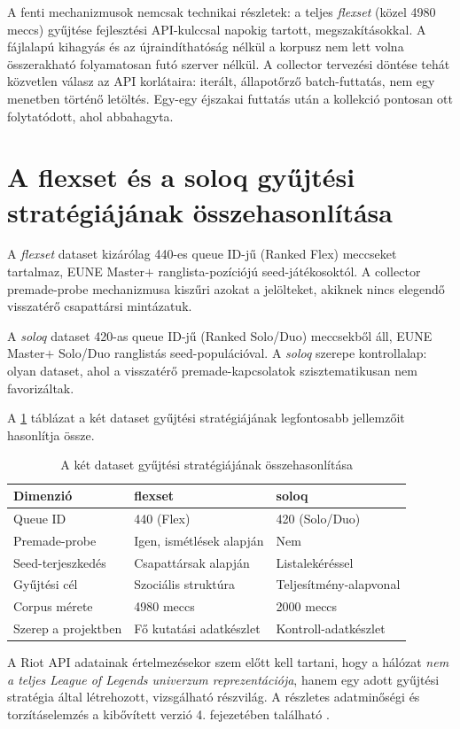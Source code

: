 A fenti mechanizmusok nemcsak technikai részletek: a teljes \textit{flexset} (közel 4980 meccs) gyűjtése fejlesztési API-kulccsal napokig tartott, megszakításokkal. A fájlalapú kihagyás és az újraindíthatóság nélkül a korpusz nem lett volna összerakható folyamatosan futó szerver nélkül. A collector tervezési döntése tehát közvetlen válasz az API korlátaira: iterált, állapotőrző batch-futtatás, nem egy menetben történő letöltés. Egy-egy éjszakai futtatás után a kollekció pontosan ott folytatódott, ahol abbahagyta.

\section{A flexset és a soloq gyűjtési stratégiájának összehasonlítása}

A \textit{flexset} dataset kizárólag 440-es queue ID-jű (Ranked Flex) meccseket tartalmaz, EUNE Master$+$ ranglista-pozíciójú seed-játékosoktól. A collector premade-probe mechanizmusa kiszűri azokat a jelölteket, akiknek nincs elegendő visszatérő csapattársi mintázatuk.

A \textit{soloq} dataset 420-as queue ID-jű (Ranked Solo/Duo) meccsekből áll, EUNE Master$+$ Solo/Duo ranglistás seed-populációval. A \textit{soloq} szerepe kontrollalap: olyan dataset, ahol a visszatérő premade-kapcsolatok szisztematikusan nem favorizáltak.

A \ref{tab:dataset-strategy} táblázat a két dataset gyűjtési stratégiájának legfontosabb jellemzőit hasonlítja össze.

\begin{table}[H]
\centering
\caption{A két dataset gyűjtési stratégiájának összehasonlítása}
\label{tab:dataset-strategy}
\begin{tabularx}{\textwidth}{|>{\raggedright\arraybackslash}p{4.2cm}|X|X|}
\hline
\textbf{Dimenzió} & \textbf{flexset} & \textbf{soloq} \\
\hline
Queue ID & 440 (Flex) & 420 (Solo/Duo) \\
Premade-probe & Igen, ismétlések alapján & Nem \\
Seed-terjeszkedés & Csapattársak alapján & Listalekéréssel \\
Gyűjtési cél & Szociális struktúra & Teljesítmény-alapvonal \\
Corpus mérete & 4980 meccs & 2000 meccs \\
Szerep a projektben & Fő kutatási adatkészlet & Kontroll-adatkészlet \\
\hline
\end{tabularx}
\end{table}

A Riot API adatainak értelmezésekor szem előtt kell tartani, hogy a hálózat \emph{nem a teljes League of Legends univerzum reprezentációja}, hanem egy adott gyűjtési stratégia által létrehozott, vizsgálható részvilág. A részletes adatminőségi és torzításelemzés a kibővített verzió 4. fejezetében található \cite{premadegraph-full}.
